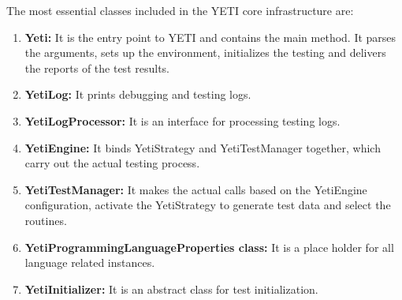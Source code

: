 The most essential classes included in the YETI core infrastructure are:
\begin{enumerate}
\item {\textbf{Yeti:}} It is the entry point to YETI and contains the main method. It parses the arguments, sets up the environment, initializes the testing and delivers the reports of the test results.
\item {\textbf{YetiLog:}} It prints debugging and testing logs. 
\item {\textbf{YetiLogProcessor:}} It is an interface for processing testing logs.
\item {\textbf{YetiEngine:}} It binds YetiStrategy and YetiTestManager together, which carry out the actual testing process.
\item {\textbf{YetiTestManager:}} It makes the actual calls based on the YetiEngine configuration, activate the YetiStrategy to generate test data and select the routines.
\item {\textbf{YetiProgrammingLanguageProperties class:}} It is a place holder for all language related instances.
\item {\textbf{YetiInitializer:}} It is an abstract class for test initialization.
\end{enumerate}

